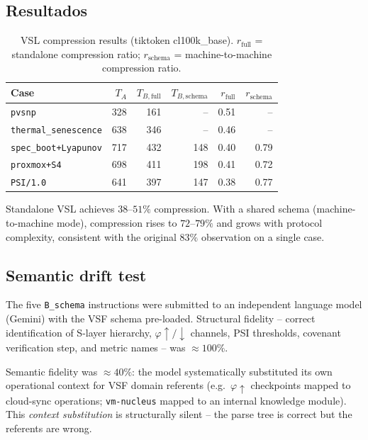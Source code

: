 \documentclass[11pt, a4paper]{article}
\begin{document}
\subsection{Resultados}

\begin{table}[h]
\centering
\caption{VSL compression results (tiktoken cl100k\_base).
  $r_\text{full}$ = standalone compression ratio;
  $r_\text{schema}$ = machine-to-machine compression ratio.}
\label{tab:vsl}
\begin{tabular}{lrrrrr}
\hline
Case & $T_A$ & $T_{B,\text{full}}$ & $T_{B,\text{schema}}$
     & $r_\text{full}$ & $r_\text{schema}$ \\
\hline
\texttt{pvsnp}               & 328 & 161 &  --  & 0.51 &  --  \\
\texttt{thermal\_senescence} & 638 & 346 &  --  & 0.46 &  --  \\
\texttt{spec\_boot+Lyapunov} & 717 & 432 & 148  & 0.40 & 0.79 \\
\texttt{proxmox+S4}          & 698 & 411 & 198  & 0.41 & 0.72 \\
\texttt{PSI/1.0}             & 641 & 397 & 147  & 0.38 & 0.77 \\
\hline
\end{tabular}
\end{table}

Standalone VSL achieves $38$--$51\%$ compression.
With a shared schema (machine-to-machine mode), compression rises to
$72$--$79\%$ and grows with protocol complexity, consistent with the
original $83\%$ observation on a single case.

\subsection{Semantic drift test}

The five \texttt{B\_schema} instructions were submitted to an independent
language model (Gemini) with the VSF schema pre-loaded.
Structural fidelity -- correct identification of S-layer hierarchy,
$\varphi\!\uparrow/\!\downarrow$ channels, PSI thresholds, covenant
verification step, and metric names -- was $\approx 100\%$.

Semantic fidelity was $\approx 40\%$: the model systematically substituted
its own operational context for VSF domain referents
(e.g.\ $\varphi\!\uparrow$ checkpoints mapped to cloud-sync operations;
\texttt{vm-nucleus} mapped to an internal knowledge module).
This \emph{context substitution} is structurally silent -- the parse tree
is correct but the referents are wrong.
\end{document}
